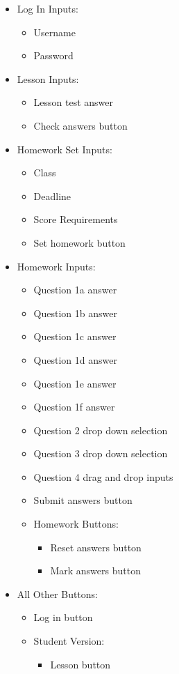 \begin{itemize}
	\item Log In Inputs:
	\begin{itemize}
		\item Username
		\item Password
	\end{itemize}
	\item Lesson Inputs:
	\begin{itemize}
		\item Lesson test answer
		\item Check answers button
	\end{itemize}
	\item Homework Set Inputs:
	\begin{itemize}
		\item Class
		\item Deadline
		\item Score Requirements
		\item Set homework button
	\end{itemize}
	\item Homework Inputs:
	\begin{itemize}
		\item Question 1a answer
		\item Question 1b answer
		\item Question 1c answer
		\item Question 1d answer
		\item Question 1e answer
		\item Question 1f answer
		\item Question 2 drop down selection
		\item Question 3 drop down selection
		\item Question 4 drag and drop inputs
		\item Submit answers button
		\item Homework Buttons:
		\begin{itemize}
			\item Reset answers button
			\item Mark answers button
		\end{itemize}
	\end{itemize}
	\item All Other Buttons:
	\begin{itemize}
		\item Log in button
		\item Student Version:
		\begin{itemize}
			\item Lesson button

\end{itemize}
\end{itemize}
\end{itemize}
